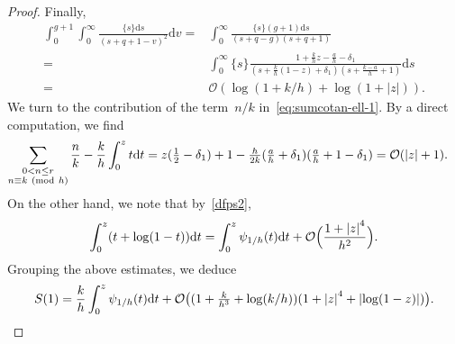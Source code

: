 \documentclass[11pt]{amsart}
\renewcommand{\mod}[1]{~\pr{\textnormal{mod}~#1}}
\theoremstyle{definition}
\newcommand{\ssum}[1]{\sum_{\substack{#1}}}
\newcommand{\pr}[1]{\mathchoice{\left( #1\right)}{(#1)}{(#1)}{(#1)}}
\newcommand{\df}{\mathrm{d}}
\newcommand{\Oh}{\mathcal{O}}
\newcommand{\1}{{\mathbf 1}}
\newcommand{\abs}[1]{\left|#1\right|}
\let\originalleft\left
\let\originalright\right
\renewcommand{\left}{\mathopen{}\mathclose\bgroup\originalleft}
\renewcommand{\right}{\aftergroup\egroup\originalright}
\numberwithin{equation}{section}
\begin{document}
\begin{proof}
  Finally,
  \begin{align*}
    \int_0^{g+1}\int_0^\infty \frac{\{s\}\df s}{(s+q+1-v)^2}\df v = {}& \int_0^\infty \frac{\{s\}(g+1)\df s}{(s+q-g)(s+q+1)} \\
    = {}& \int_0^\infty \{s\}\frac{1 + \frac kh z - \frac ah - \delta_1}{(s+\frac kh(1-z) + \delta_1)(s+\frac{k-a}h+1)}\df s \\
    = {}& \Oh(\log (1+k/h)+\log(1+|z|) ).
  \end{align*}
  We turn to the contribution of the term~$n/k$ in~\eqref{eq:sumcotan-ell-1}. By a direct computation, we find
  \begin{align*}
    \ssum{0<n\leq r \\ n\equiv k \mod{h}} \frac nk - \frac kh \int_0^z t\df t =
    {}& z(\tfrac12-\delta_1) + 1 - \tfrac{h}{2k}(\tfrac ah + \delta_1)(\tfrac ah + 1 - \delta_1) = \Oh(\abs{z}+1).
  \end{align*}
  On the other hand, we note that by~\eqref{dfps2},
  $$ \int_0^z (t + \log(1-t))\df t = \int_0^z \psi_{1/h}(t)\df t + \Oh\Big(\frac{1+\abs{z}^4}{h^2}\Big). $$
  Grouping the above estimates, we deduce
  \begin{equation}
    S(1) = \frac kh\int_0^z \psi_{1/h}(t)\df t + \Oh\big((1 + \tfrac{k}{h^3} + \log(k/h))(1 + \abs{z}^4 + \abs{\log(1-z)})\big).\label{eq:estim-S1}
  \end{equation}
  

\end{proof}
\end{document}
